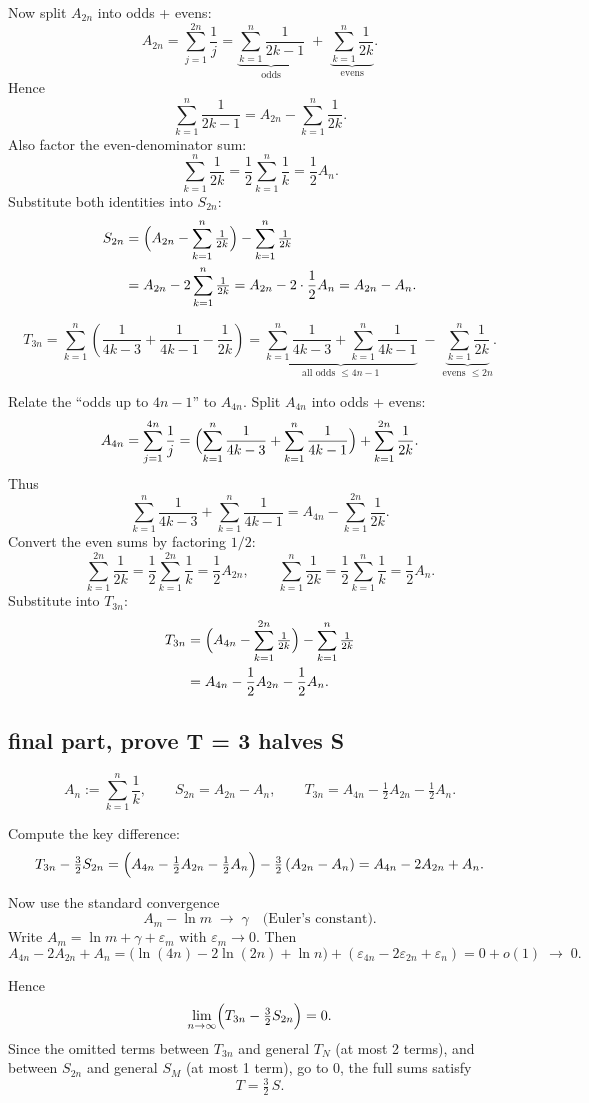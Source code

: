 \documentclass[12pt,a4paper]{article}
\theoremstyle{definition}
\theoremstyle{remark}
\begin{document}
Now split \(A_{2n}\) into odds + evens:
\[
A_{2n}
= \sum_{j=1}^{2n}\frac1j
= \underbrace{\sum_{k=1}^{n}\frac{1}{2k-1}}_{\text{odds}}
  \;+\; \underbrace{\sum_{k=1}^{n}\frac{1}{2k}}_{\text{evens}}.
\]
Hence
\[
\sum_{k=1}^{n}\frac{1}{2k-1}
= A_{2n} - \sum_{k=1}^{n}\frac{1}{2k}.
\]
Also factor the even-denominator sum:
\[
\sum_{k=1}^{n}\frac{1}{2k} = \frac12 \sum_{k=1}^{n}\frac1k = \frac12 A_n.
\]
Substitute both identities into \(S_{2n}\):
\begin{align*}
S_{2n}
&= \Bigl(A_{2n} - \sum_{k=1}^{n}\tfrac{1}{2k}\Bigr)
   - \sum_{k=1}^{n}\tfrac{1}{2k} \\
&= A_{2n} - 2\sum_{k=1}^{n}\tfrac{1}{2k}
 = A_{2n} - 2\cdot \frac12 A_n
 = A_{2n} - A_n.
\end{align*}

\[
T_{3n}
= \sum_{k=1}^{n}\!\left(\frac{1}{4k-3}+\frac{1}{4k-1}-\frac{1}{2k}\right)
= \underbrace{\sum_{k=1}^{n}\frac{1}{4k-3}+\sum_{k=1}^{n}\frac{1}{4k-1}}_{\text{all odds } \le 4n-1}
  \;-\; \underbrace{\sum_{k=1}^{n}\frac{1}{2k}}_{\text{evens } \le 2n}.
\]

Relate the “odds up to \(4n-1\)” to \(A_{4n}\).
Split \(A_{4n}\) into odds + evens:
\[
A_{4n}
= \sum_{j=1}^{4n}\frac1j
= \Bigl(\sum_{k=1}^{n}\frac{1}{4k-3} + \sum_{k=1}^{n}\frac{1}{4k-1}\Bigr)
  + \sum_{k=1}^{2n}\frac{1}{2k}.
\]
Thus
\[
\sum_{k=1}^{n}\frac{1}{4k-3} + \sum_{k=1}^{n}\frac{1}{4k-1}
= A_{4n} - \sum_{k=1}^{2n}\frac{1}{2k}.
\]
Convert the even sums by factoring \(1/2\):
\[
\sum_{k=1}^{2n}\frac{1}{2k} = \frac12 \sum_{k=1}^{2n}\frac1k = \frac12 A_{2n},
\qquad
\sum_{k=1}^{n}\frac{1}{2k} = \frac12 \sum_{k=1}^{n}\frac1k = \frac12 A_n.
\]
Substitute into \(T_{3n}\):
\begin{align*}
T_{3n}
&= \Bigl(A_{4n} - \sum_{k=1}^{2n}\tfrac{1}{2k}\Bigr)
   - \sum_{k=1}^{n}\tfrac{1}{2k} \\
&= A_{4n} - \frac12 A_{2n} - \frac12 A_n.
\end{align*}

\subsection*{final part, prove T = 3 halves S}

\[
A_n := \sum_{k=1}^n \frac1k,\qquad
S_{2n} = A_{2n} - A_n,\qquad
T_{3n} = A_{4n} - \tfrac12 A_{2n} - \tfrac12 A_n.
\]

Compute the key difference:
\[
T_{3n} - \tfrac32 S_{2n}
= \Bigl(A_{4n} - \tfrac12 A_{2n} - \tfrac12 A_n\Bigr)
  - \tfrac32\,(A_{2n} - A_n)
= A_{4n} - 2A_{2n} + A_n.
\]

Now use the standard convergence
\[
A_m - \ln m \;\longrightarrow\; \gamma
\quad\text{(Euler’s constant)}.
\]
Write \(A_m = \ln m + \gamma + \varepsilon_m\) with \(\varepsilon_m \to 0\). Then
\[
A_{4n} - 2A_{2n} + A_n
= \bigl(\ln(4n) - 2\ln(2n) + \ln n\bigr)
  + (\varepsilon_{4n} - 2\varepsilon_{2n} + \varepsilon_n)
= 0 + o(1) \;\longrightarrow\; 0.
\]

Hence
\[
\lim_{n\to\infty}\Bigl(T_{3n} - \tfrac32 S_{2n}\Bigr) = 0.
\]
Since the omitted terms between \(T_{3n}\) and general \(T_N\) (at most 2 terms), and between \(S_{2n}\) and general \(S_M\) (at most 1 term), go to 0, the full sums satisfy
\[
T = \tfrac32\, S.
\]
\end{document}

